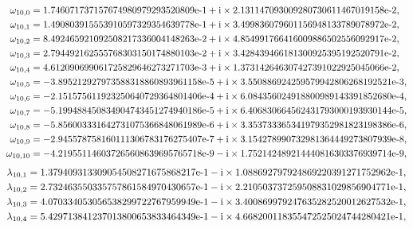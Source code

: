 \documentclass[12pt]{article}
\def\i{{\textnormal i}}
\theoremstyle{definition}
\begin{document}
{\begin{align*}
\omega_{10,0}&=1.746071737157674980979293520809\text{e-}1 +\i \times    					   2.131147093009280730611467019158\text{e-}2  ,\\
\omega_{10,1}&=1.490803915553910597329354639778\text{e-}1+\i \times    					   3.499836079601156948133789078972\text{e-}2, \\
\omega_{10,2}&=8.492465921092508217336004148263\text{e-}2+\i \times    					   4.854991766416009886502556092917\text{e-}2, \\
\omega_{10,3}&=2.794492162555768303150174880103\text{e-}2+\i \times    					   3.428439466181300925395192520791\text{e-}2  , \\ 
\omega_{10,4}&=4.612090699061725829646273271703\text{e-}3+\i \times      					   1.373142646307427391022925045066\text{e-}2, \\
\omega_{10,5}&=-3.895212927973588318860893961158\text{e-}5+\i \times      			    3.550886924259579942806268192521\text{e-}3 , \\
\omega_{10,6}&=-2.151575611923250640729364801406\text{e-}4+\i \times      				6.084356024918800989143391852680\text{e-}4 , \\
\omega_{10,7}&=-5.199488450834904743451274940186\text{e-}5+\i \times      			    6.406830664562431793000193930144\text{e-}5, \\
\omega_{10,8}&=-5.856003331642731075366848061989\text{e-}6+\i \times      			    3.353733365341979352981823198386\text{e-}6, \\ 
\omega_{10,9}&=-2.945578758160111306783176275407\text{e-}7+\i \times      			    3.154278990732981364449273807939\text{e-}8, \\
\omega_{10,10}&=-4.219551146037265608639695765718\text{e-}9-\i \times      				 1.752142489214440816303376939714\text{e-}9,        
    \end{align*}            
\begin{align*}
\lambda_{10,1}&= 1.379409313309054508271675868217\text{e-}1  -\i \times      				 1.088692797924869220391271752962\text{e-}1 , \\
\lambda_{10,2}&= 2.732463550335757861584970430657\text{e-}1      -\i \times           2.210503737259508831029856904771\text{e-}1 , \\
\lambda_{10,3}&= 4.070334053056538299722767959949\text{e-}1  -\i \times      				 3.400869979247635282520012627532\text{e-}1  , \\ 
\lambda_{10,4}&= 5.429713841237013800653833464349\text{e-}1   -\i \times      				 4.668200118355472525024744280421\text{e-}1  , \\

\end{align*}}
\end{document}
